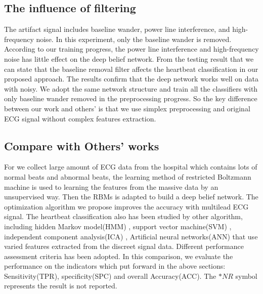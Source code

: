 \documentclass[conference]{IEEEtran}
\begin{document}
\subsection{The influence of filtering}

The artifact signal includes baseline wander, power line interference, and high-frequency noise. In this experiment, only the baseline wander is removed. According to our training progress, the power line interference and high-frequency noise has little effect on the deep belief network. From the testing result that we can state that the baseline removal filter affects the heartbeat classification in our proposed approach. The results confirm that the deep network works well on data with noisy. We adopt the same network structure and train all the classifiers with only baseline wander removed in the preprocessing progress. So the key difference between our work and others' is that we use simplex preprocessing and original ECG signal without complex features extraction.

\subsection{Compare with Others' works}

For we collect large amount of ECG data from the hospital which contains lots of normal beats and abnormal beats, the learning method of restricted Boltzmann machine is used to learning the features from the massive data by an unsupervised way. Then the RBMs is adapted to build a deep belief network. The optimization algorithm we propose improves the accuracy with multilead ECG signal. The heartbeat classification also has been studied by other algorithm, including hidden Markov model(HMM) \cite{Andreao}, support vector machine(SVM) \cite{Asl}\cite{Melgani}, independent component analysis(ICA) \cite{Sung}, Artificial neural networks(ANN) that use varied features extracted from the discreet signal data. Different performance assessment criteria has been adopted. In this comparison, we evaluate the performance on the indicators which put forward in the above sections: Sensitivity(TPR), specificity(SPC) and overall Accuracy(ACC). The $*NR$ symbol represents the result is not reported. 
\end{document}

